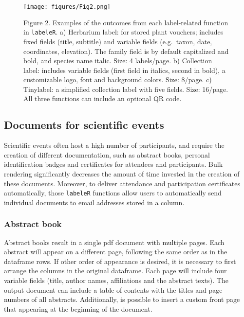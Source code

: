\documentclass[10pt,a4paper,onecolumn]{article}
\begin{document}
\begin{figure}
\centering
\texttt{[image: figures/Fig2.png]}
\caption{Figure 2. Examples of the outcomes from each label-related
function in \texttt{labeleR}. a) Herbarium label: for stored plant
vouchers; includes fixed fields (title, subtitle) and variable fields
(e.g.~taxon, date, coordinates, elevation). The family field is by
default capitalized and bold, and species name italic. Size: 4
labels/page. b) Collection label: includes variable fields (first field
in italics, second in bold), a customizable logo, font and background
colors. Size: 8/page. c) Tinylabel: a simplified collection label with
five fields. Size: 16/page. All three functions can include an optional
QR code.}
\end{figure}

\subsection{Documents for scientific
events}\label{documents-for-scientific-events}

Scientific events often host a high number of participants, and require
the creation of different documentation, such as abstract books,
personal identification badges and certificates for attendees and
participants. Bulk rendering significantly decreases the amount of time
invested in the creation of these documents. Moreover, to deliver
attendance and participation certificates automatically, those
\texttt{labeleR} functions allow users to automatically send individual
documents to email addresses stored in a column.

\subsubsection{Abstract book}\label{abstract-book}

Abstract books result in a single pdf document with multiple pages. Each
abstract will appear on a different page, following the same order as in
the dataframe rows. If other order of appearance is desired, it is
necessary to first arrange the columns in the original dataframe. Each
page will include four variable fields (title, author names,
affiliations and the abstract texts). The output document can include a
table of contents with the titles and page numbers of all abstracts.
Additionally, is possible to insert a custom front page that appearing
at the beginning of the document.
\end{document}
